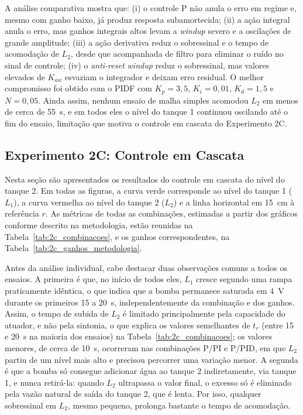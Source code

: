 \documentclass[a4paper,12pt]{article}
\begin{document}
\begin{justify}
    \hspace{4ex}A análise comparativa mostra que: (i) o controle P não anula o erro em regime e, mesmo com ganho baixo, já produz resposta subamortecida; (ii) a ação integral anula o erro, mas ganhos integrais altos levam a \textit{windup} severo e a oscilações de grande amplitude; (iii) a ação derivativa reduz o sobressinal e o tempo de acomodação de $L_2$, desde que acompanhada de filtro para eliminar o ruído no sinal de controle; (iv) o \textit{anti-reset windup} reduz o sobressinal, mas valores elevados de $K_{aw}$ esvaziam o integrador e deixam erro residual. O melhor compromisso foi obtido com o PIDF com $K_p = 3{,}5$, $K_i = 0{,}01$, $K_d = 1{,}5$ e $N = 0{,}05$. Ainda assim, nenhum ensaio de malha simples acomodou $L_2$ em menos de cerca de 55~s, e em todos eles o nível do tanque 1 continuou oscilando até o fim do ensaio, limitação que motiva o controle em cascata do Experimento 2C.
\end{justify}

\newpage

\subsection{Experimento 2C: Controle em Cascata}

\begin{justify}
    \hspace{4ex}Nesta seção são apresentados os resultados do controle em cascata do nível do tanque 2. Em todas as figuras, a curva verde corresponde ao nível do tanque 1 ($L_1$), a curva vermelha ao nível do tanque 2 ($L_2$) e a linha horizontal em 15~cm à referência $r$. As métricas de todas as combinações, estimadas a partir dos gráficos conforme descrito na metodologia, estão reunidas na Tabela~\ref{tab:2c_combinacoes}, e os ganhos correspondentes, na Tabela~\ref{tab:2c_ganhos_metodologia}.
\end{justify}

\begin{justify}
    \hspace{4ex}Antes da análise individual, cabe destacar duas observações comuns a todos os ensaios. A primeira é que, no início de todos eles, $L_1$ cresce segundo uma rampa praticamente idêntica, o que indica que a bomba permanece saturada em $4$~V durante os primeiros 15 a 20~s, independentemente da combinação e dos ganhos. Assim, o tempo de subida de $L_2$ é limitado principalmente pela capacidade do atuador, e não pela sintonia, o que explica os valores semelhantes de $t_r$ (entre 15 e 20~s na maioria dos ensaios) na Tabela~\ref{tab:2c_combinacoes}; os valores menores, de cerca de 10~s, ocorreram nas combinações P/PI e P/PID, em que $L_2$ partiu de um nível mais alto e precisou percorrer uma variação menor. A segunda é que a bomba só consegue adicionar água ao tanque 2 indiretamente, via tanque 1, e nunca retirá-la: quando $L_2$ ultrapassa o valor final, o excesso só é eliminado pela vazão natural de saída do tanque 2, que é lenta. Por isso, qualquer sobressinal em $L_2$, mesmo pequeno, prolonga bastante o tempo de acomodação.
\end{justify}
\end{document}
